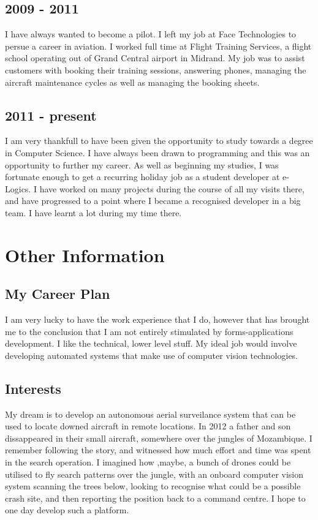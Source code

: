 \documentclass[a4paper]{article}
\begin{document}
	\subsection*{2009 - 2011}
		I have always wanted to become a pilot. I left my job at Face Technologies to persue a career in aviation. I worked full time at
		Flight Training Services, a flight school operating out of Grand Central airport in Midrand. My job was to assist customers with
		booking their training sessions, answering phones, managing the aircraft maintenance cycles as well as managing the booking sheets.
	\subsection*{2011 - present}
		I am very thankfull to have been given the opportunity to study towards a degree in Computer Science. I have always been drawn to programming
		and this was an opportunity to further my career. As well as beginning my studies, I was fortunate enough to get a recurring holiday job as
		a student developer at e-Logics. I have worked on many projects during the course of all my visits there, and have progressed to a point where I
		became a recognised developer in a big team. I have learnt a lot during my time there.

\section*{Other Information}

	\subsection*{My Career Plan}
	
	I am very lucky to have the work experience that I do, however that has brought me to the conclusion that I am not entirely stimulated by forms-applications development.
	I like the technical, lower level stuff. My ideal job would involve developing automated systems that make use of computer vision technologies. 

	\subsection*{Interests}
	
	My dream is to develop an autonomous aerial surveilance system that can be used to locate downed aircraft in remote locations. In 2012 a father and son dissappeared 
	in their small aircraft, somewhere over the jungles of Mozambique. I remember following the story, and witnessed how much effort and time was spent in the search operation.
	I imagined how ,maybe, a bunch of drones could be utilised to fly search patterns over the jungle, with an onboard computer vision system scanning the trees below, looking to
	recognise what could be a possible crash site, and then reporting the position back to a command centre. I hope to one day develop such a platform.
\end{document}
